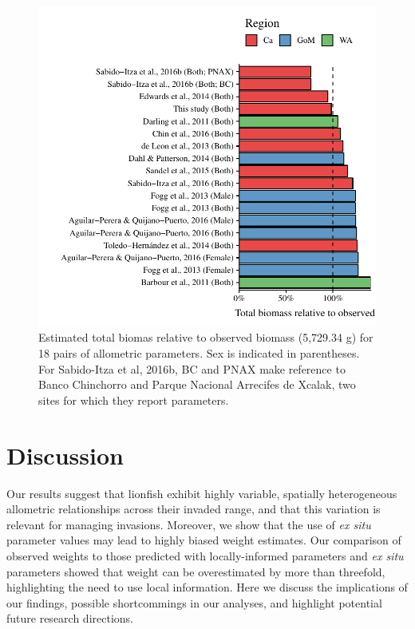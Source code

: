 \documentclass[fleqn,10pt,lineno]{wlpeerj} %
\begin{document}
\begin{figure}
\centering
\includegraphics{Manuscript_files/figure-latex/unnamed-chunk-9-1.pdf}
\caption{\label{fig:errors}Estimated total biomas relative to observed
biomass (5,729.34 g) for 18 pairs of allometric parameters. Sex is
indicated in parentheses. For Sabido-Itza et al, 2016b, BC and PNAX make
reference to Banco Chinchorro and Parque Nacional Arrecifes de Xcalak,
two sites for which they report parameters.}
\end{figure}

\clearpage

\section*{Discussion}

Our results suggest that lionfish exhibit highly variable, spatially
heterogeneous allometric relationships across their invaded range, and
that this variation is relevant for managing invasions. Moreover, we
show that the use of \emph{ex situ} parameter values may lead to highly
biased weight estimates. Our comparison of observed weights to those
predicted with locally-informed parameters and \emph{ex situ} parameters
showed that weight can be overestimated by more than threefold,
highlighting the need to use local information. Here we discuss the
implications of our findings, possible shortcommings in our analyses,
and highlight potential future research directions.
\end{document}
